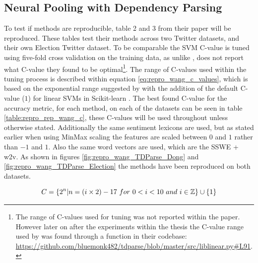 \subsection{Neural Pooling with Dependency Parsing}
To test if \citet{wang-etal-2017-tdparse} methods are reproducible, table 2 and 3 from their paper will be reproduced. These tables test their methods across two Twitter datasets, \citet{dong-etal-2014-adaptive} and their own Election Twitter dataset. To be comparable the SVM C-value is tuned using five-fold cross validation on the training data, as unlike \citet{vo2015target}, \citet{wang-etal-2017-tdparse} does not report what C-value they found to be optimal\footnote{The range of C-values \citet{wang-etal-2017-tdparse} used for tuning was not reported within the paper. However later on after the experiments within the thesis the C-value range used by \citet{wang-etal-2017-tdparse} was found through a function in their codebase: \url{https://github.com/bluemonk482/tdparse/blob/master/src/liblinear.py\#L91}.}. The range of C-values used within the tuning process is described within equation \ref{eq:repro_wang_c_values}, which is based on the exponential range suggested by \citet{hsu2003practical} with the addition of the default C-value ($1$) for linear SVMs in Scikit-learn \citep{pedregosa2011scikit}. The best found C-value for the accuracy metric, for each method, on each of the datasets can be seen in table \ref{table:repro_rep_wang_c}, these C-values will be used throughout unless otherwise stated. Additionally the same sentiment lexicons are used, but as stated earlier when using MinMax scaling the features are scaled between $0$ and $1$ rather than $-1$ and $1$. Also the same word vectors are used, which are the SSWE + w2v. As shown in figures \ref{fig:repro_wang_TDParse_Dong} and \ref{fig:repro_wang_TDParse_Election} the methods have been reproduced on both datasets.

\begin{equation}
    C=\{ 2^n | n = (i \times 2) - 17 ~for~0 < i < 10~and~i \in \mathbb{Z} \} \cup \{ 1 \} 
\label{eq:repro_wang_c_values}
\end{equation}


